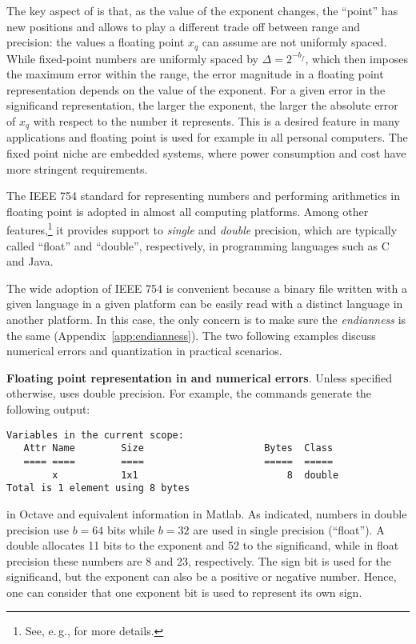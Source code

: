 The key aspect of  is that, as the value of the exponent changes, the ``point'' has new positions and allows to play a different trade off between range and precision: the values a floating point $x_q$ can assume are not uniformly spaced. While fixed-point numbers are uniformly spaced by $\Delta = 2^{-b_f}$, which then imposes the maximum error within the range, the error magnitude in a floating point representation depends on the value of the exponent. For a given error in the significand representation, the larger the exponent, the larger the absolute error of $x_q$ with respect to the number it represents. This is a desired feature in many applications and floating point is used for example in all personal computers. The fixed point niche are embedded systems, where power consumption and cost have more stringent requirements.

The IEEE 754 standard for representing numbers and performing arithmetics in floating point is adopted in almost all computing platforms. Among other features,\footnote{See, e.\,g.,  for more details.} it provides support to \emph{single} and \emph{double} precision, which are typically called ``float'' and ``double'', respectively, in programming languages such as C and Java. 

The wide adoption of IEEE 754 is convenient because a binary file written with a given language in a given platform can be easily read with a distinct language in another platform. In this case, the only concern is to make sure the \emph{endianness} is the same (Appendix~\ref{app:endianness}).
The two following examples discuss numerical errors and quantization in practical 
scenarios.

\bExample \textbf{Floating point representation in {\matlab} and numerical errors}.
Unless specified otherwise, {\matlab} uses double precision. For example, the commands  generate the following output:
\begin{verbatim}
Variables in the current scope:
   Attr Name        Size                     Bytes  Class
   ==== ====        ====                     =====  =====
        x           1x1                          8  double
Total is 1 element using 8 bytes
\end{verbatim}
in Octave and equivalent information in Matlab. As indicated, numbers in double precision use $b=64$ bits while $b=32$ are used in single precision (``float''). A double allocates 11 bits to the exponent and 52 to the significand, while in float precision these numbers are 8 and 23, respectively. The sign bit is used for the significand, but the exponent can also be a positive or negative number. Hence, one can consider that one exponent bit is used to represent its own sign.

